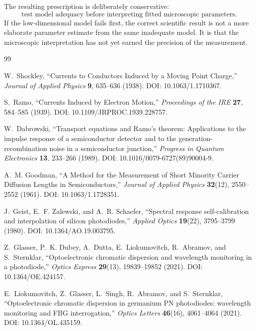 \documentclass[11pt]{article}
\begin{document}
The resulting prescription is deliberately conservative:
\begin{equation*}
\boxed{\text{test model adequacy before interpreting fitted microscopic parameters.}}
\end{equation*}
If the low-dimensional model fails first, the correct scientific result is not a more elaborate parameter estimate from the same inadequate model. It is that the microscopic interpretation has not yet earned the precision of the measurement.

\begin{thebibliography}{99}

W.~Shockley, ``Currents to Conductors Induced by a Moving Point Charge,'' \emph{Journal of Applied Physics} \textbf{9}, 635--636 (1938). DOI: 10.1063/1.1710367.

S.~Ramo, ``Currents Induced by Electron Motion,'' \emph{Proceedings of the IRE} \textbf{27}, 584--585 (1939). DOI: 10.1109/JRPROC.1939.228757.

W.~Dabrowski, ``Transport equations and Ramo's theorem: Applications to the impulse response of a semiconductor detector and to the generation-recombination noise in a semiconductor junction,'' \emph{Progress in Quantum Electronics} \textbf{13}, 233--266 (1989). DOI: 10.1016/0079-6727(89)90004-9.

A.~M. Goodman, ``A Method for the Measurement of Short Minority Carrier Diffusion Lengths in Semiconductors,'' \emph{Journal of Applied Physics} \textbf{32}(12), 2550--2552 (1961). DOI: 10.1063/1.1728351.

J.~Geist, E.~F. Zalewski, and A.~R. Schaefer, ``Spectral response self-calibration and interpolation of silicon photodiodes,'' \emph{Applied Optics} \textbf{19}(22), 3795--3799 (1980). DOI: 10.1364/AO.19.003795.

Z.~Glasser, P.~K. Dubey, A.~Dutta, E.~Liokumovitch, R.~Abramov, and S.~Sternklar, ``Optoelectronic chromatic dispersion and wavelength monitoring in a photodiode,'' \emph{Optics Express} \textbf{29}(13), 19839--19852 (2021). DOI: 10.1364/OE.424157.

E.~Liokumovitch, Z.~Glasser, L.~Singh, R.~Abramov, and S.~Sternklar, ``Optoelectronic chromatic dispersion in germanium PN photodiodes: wavelength monitoring and FBG interrogation,'' \emph{Optics Letters} \textbf{46}(16), 4061--4064 (2021). DOI: 10.1364/OL.435159.


\end{thebibliography}
\end{document}
